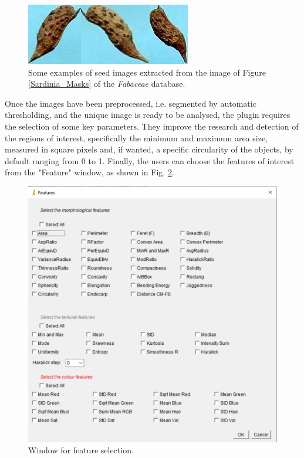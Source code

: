\documentclass[twocolumn]{svjour3}           %
\begin{document}
\begin{figure}[htbp]
	\centering
	\includegraphics[scale=0.4]{fig_sardiniaCrops.jpg}
	\caption{Some examples of seed images extracted from the image of Figure \ref{Sardinia_Masks} of the \emph{Fabaceae} database.}
	\label{Sardinia_Crops}
\end{figure}

Once the images have been preprocessed, i.e. segmented by automatic thresholding, and the unique image is ready to be analysed, the plugin requires the selection of some key parameters. They improve the research and detection of the regions of interest, specifically the minimum and maximum area size, measured in square pixels and, if wanted, a specific circularity of the objects, by default ranging from 0 to 1.
Finally, the users can choose the features of interest from the "Feature" window, as shown in Fig.  \ref{fig:features_selection}.

\begin{figure}[htbp]
	\centering
	\includegraphics[height=0.35\textheight]{fig_featureSel.jpg}
	\caption{\label{fig:features_selection}Window for feature selection.}
\end{figure}
\end{document}
